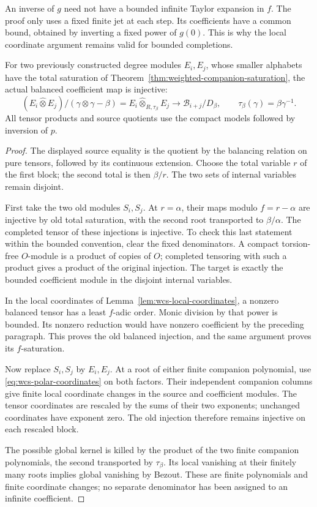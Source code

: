 An inverse of \(g\) need not have a bounded infinite Taylor
expansion in \(f\).  The proof only uses a fixed finite jet at
each step.  Its coefficients have a common bound, obtained by
inverting a fixed power of \(g(0)\).  This is why the local
coordinate argument remains valid for bounded completions.

\begin{lemma}\label{lem:wcs-balanced}
For two previously constructed degree modules \(E_i,E_j\),
whose smaller alphabets have the total saturation of
Theorem~\ref{thm:weighted-companion-saturation}, the actual
balanced coefficient map is injective:
\[
 (E_i\widehat\otimes E_j)/(\gamma\otimes\gamma-\beta)
   =E_i\widehat\otimes_{R,\tau_\beta}E_j
       \longrightarrow \mathcal B_{i+j}/D_\beta,
 \qquad \tau_\beta(\gamma)=\beta\gamma^{-1}.
\]
All tensor products and source quotients use the compact
models followed by inversion of \(p\).
\end{lemma}

\begin{proof}
The displayed source equality is the quotient by the balancing
relation on pure tensors, followed by its continuous extension.
Choose the total variable \(r\) of the first block; the second
total is then \(\beta/r\).  The two sets of internal variables
remain disjoint.

First take the two old modules \(S_i,S_j\).  At \(r=\alpha\),
their maps modulo \(f=r-\alpha\) are injective by old total
saturation, with the second root transported to \(\beta/\alpha\).
The completed tensor of these injections is injective.
To check this last statement within the bounded convention,
clear the fixed denominators.  A compact torsion-free
\(O\)-module is a product of copies of \(O\); completed tensoring
with such a product gives a product of the original injection.
The target is exactly the bounded coefficient module in the
disjoint internal variables.

In the local coordinates of Lemma~\ref{lem:wcs-local-coordinates},
a nonzero balanced tensor has a least \(f\)-adic order.
Monic division by that power is bounded.  Its nonzero reduction
would have nonzero coefficient by the preceding paragraph.
This proves the old balanced injection, and the same argument
proves its \(f\)-saturation.

Now replace \(S_i,S_j\) by \(E_i,E_j\).  At a root of either
finite companion polynomial, use
\eqref{eq:wcs-polar-coordinates} on both factors.  Their
independent companion columns give finite local coordinate
changes in the source and coefficient modules.  The tensor
coordinates are rescaled by the sums of their two exponents;
unchanged coordinates have exponent zero.  The old injection
therefore remains injective on each rescaled block.

The possible global kernel is killed by the product of the
two finite companion polynomials, the second transported by
\(\tau_\beta\).  Its local vanishing at their finitely many
roots implies global vanishing by Bezout.  These are finite
polynomials and finite coordinate changes; no separate
denominator has been assigned to an infinite coefficient.
\end{proof}

